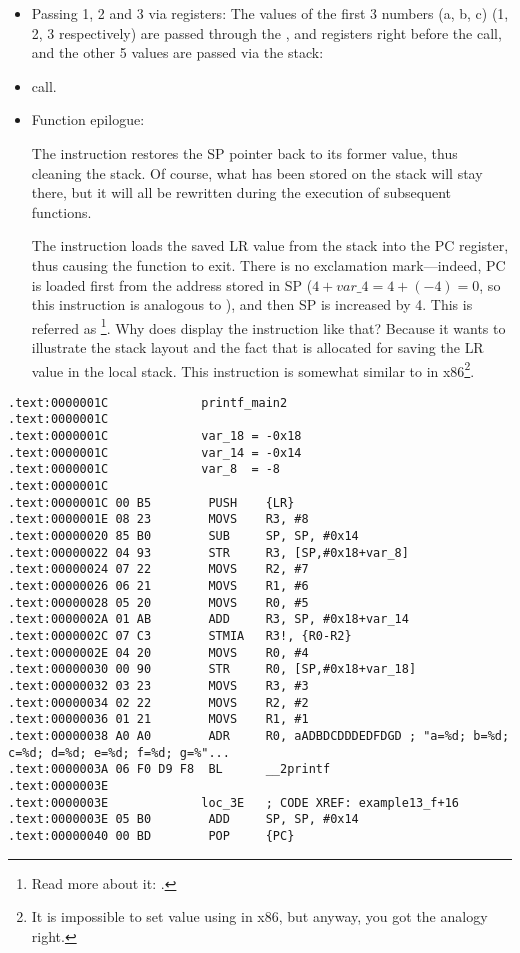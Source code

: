 \begin{itemize}
\item Passing 1, 2 and 3 via registers:
The values of the first 3 numbers (a, b, c) (1, 2, 3 respectively) are passed through the 
,  and 
registers right before the \printf call, and the other
5 values are passed via the stack:

\item \printf call.

\item Function epilogue:

The  instruction restores the \ac{SP} pointer back to its former value, thus cleaning the stack.
Of course, what has been stored on the stack will stay there, but it will all be rewritten during the execution of subsequent functions.

The  instruction loads the saved \ac{LR} value from the stack into the \ac{PC} register, thus causing the function to exit.
There is no exclamation mark---indeed, \ac{PC} is loaded first from the address stored in \ac{SP} ($4+var\_4=4+(-4)=0$, so this instruction is analogous to ), and then \ac{SP} is increased by 4.
This is referred as \footnote{Read more about it: .}.
Why does \IDA display the instruction like that?
Because it wants to illustrate the stack layout and the fact that  is allocated for saving the \ac{LR} value in the local stack.
This instruction is somewhat similar to  in x86\footnote{It is impossible to set  value using \POP in x86, but anyway, you got the analogy right.}.

\end{itemize}

\myparagraph{\OptimizingKeilVI: \ThumbMode}

\begin{lstlisting}
.text:0000001C             printf_main2
.text:0000001C
.text:0000001C             var_18 = -0x18
.text:0000001C             var_14 = -0x14
.text:0000001C             var_8  = -8
.text:0000001C
.text:0000001C 00 B5        PUSH    {LR}
.text:0000001E 08 23        MOVS    R3, #8
.text:00000020 85 B0        SUB     SP, SP, #0x14
.text:00000022 04 93        STR     R3, [SP,#0x18+var_8]
.text:00000024 07 22        MOVS    R2, #7
.text:00000026 06 21        MOVS    R1, #6
.text:00000028 05 20        MOVS    R0, #5
.text:0000002A 01 AB        ADD     R3, SP, #0x18+var_14
.text:0000002C 07 C3        STMIA   R3!, {R0-R2}
.text:0000002E 04 20        MOVS    R0, #4
.text:00000030 00 90        STR     R0, [SP,#0x18+var_18]
.text:00000032 03 23        MOVS    R3, #3
.text:00000034 02 22        MOVS    R2, #2
.text:00000036 01 21        MOVS    R1, #1
.text:00000038 A0 A0        ADR     R0, aADBDCDDDEDFDGD ; "a=%d; b=%d; c=%d; d=%d; e=%d; f=%d; g=%"...
.text:0000003A 06 F0 D9 F8  BL      __2printf
.text:0000003E
.text:0000003E             loc_3E   ; CODE XREF: example13_f+16
.text:0000003E 05 B0        ADD     SP, SP, #0x14
.text:00000040 00 BD        POP     {PC}
\end{lstlisting}

